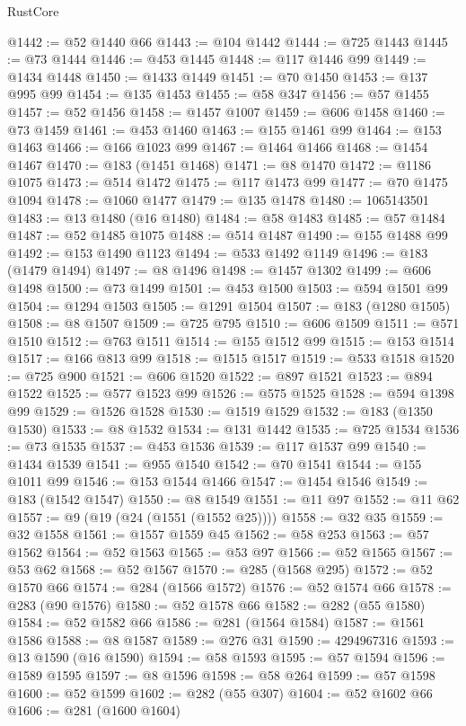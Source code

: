 \begin{lexlean}{RustCore}
\begin{coremodule}
@1442 := @52 @1440 @66
@1443 := @104 @1442
@1444 := @725 @1443
@1445 := @73 @1444
@1446 := @453 @1445
@1448 := @117 @1446 @99
@1449 := @1434 @1448
@1450 := @1433 @1449
@1451 := @70 @1450
@1453 := @137 @995 @99
@1454 := @135 @1453
@1455 := @58 @347
@1456 := @57 @1455
@1457 := @52 @1456
@1458 := @1457 @1007
@1459 := @606 @1458
@1460 := @73 @1459
@1461 := @453 @1460
@1463 := @155 @1461 @99
@1464 := @153 @1463
@1466 := @166 @1023 @99
@1467 := @1464 @1466
@1468 := @1454 @1467
@1470 := @183 (@1451 @1468)
@1471 := @8 @1470
@1472 := @1186 @1075
@1473 := @514 @1472
@1475 := @117 @1473 @99
@1477 := @70 @1475 @1094
@1478 := @1060 @1477
@1479 := @135 @1478
@1480 := 1065143501
@1483 := @13 @1480 (@16 @1480)
@1484 := @58 @1483
@1485 := @57 @1484
@1487 := @52 @1485 @1075
@1488 := @514 @1487
@1490 := @155 @1488 @99
@1492 := @153 @1490 @1123
@1494 := @533 @1492 @1149
@1496 := @183 (@1479 @1494)
@1497 := @8 @1496
@1498 := @1457 @1302
@1499 := @606 @1498
@1500 := @73 @1499
@1501 := @453 @1500
@1503 := @594 @1501 @99
@1504 := @1294 @1503
@1505 := @1291 @1504
@1507 := @183 (@1280 @1505)
@1508 := @8 @1507
@1509 := @725 @795
@1510 := @606 @1509
@1511 := @571 @1510
@1512 := @763 @1511
@1514 := @155 @1512 @99
@1515 := @153 @1514
@1517 := @166 @813 @99
@1518 := @1515 @1517
@1519 := @533 @1518
@1520 := @725 @900
@1521 := @606 @1520
@1522 := @897 @1521
@1523 := @894 @1522
@1525 := @577 @1523 @99
@1526 := @575 @1525
@1528 := @594 @1398 @99
@1529 := @1526 @1528
@1530 := @1519 @1529
@1532 := @183 (@1350 @1530)
@1533 := @8 @1532
@1534 := @131 @1442
@1535 := @725 @1534
@1536 := @73 @1535
@1537 := @453 @1536
@1539 := @117 @1537 @99
@1540 := @1434 @1539
@1541 := @955 @1540
@1542 := @70 @1541
@1544 := @155 @1011 @99
@1546 := @153 @1544 @1466
@1547 := @1454 @1546
@1549 := @183 (@1542 @1547)
@1550 := @8 @1549
@1551 := @11 @97
@1552 := @11 @62
@1557 := @9 (@19 (@24 (@1551 (@1552 @25))))
@1558 := @32 @35
@1559 := @32 @1558
@1561 := @1557 @1559 @45
@1562 := @58 @253
@1563 := @57 @1562
@1564 := @52 @1563
@1565 := @53 @97
@1566 := @52 @1565
@1567 := @53 @62
@1568 := @52 @1567
@1570 := @285 (@1568 @295)
@1572 := @52 @1570 @66
@1574 := @284 (@1566 @1572)
@1576 := @52 @1574 @66
@1578 := @283 (@90 @1576)
@1580 := @52 @1578 @66
@1582 := @282 (@55 @1580)
@1584 := @52 @1582 @66
@1586 := @281 (@1564 @1584)
@1587 := @1561 @1586
@1588 := @8 @1587
@1589 := @276 @31
@1590 := 4294967316
@1593 := @13 @1590 (@16 @1590)
@1594 := @58 @1593
@1595 := @57 @1594
@1596 := @1589 @1595
@1597 := @8 @1596
@1598 := @58 @264
@1599 := @57 @1598
@1600 := @52 @1599
@1602 := @282 (@55 @307)
@1604 := @52 @1602 @66
@1606 := @281 (@1600 @1604)

\end{coremodule}
\end{lexlean}
